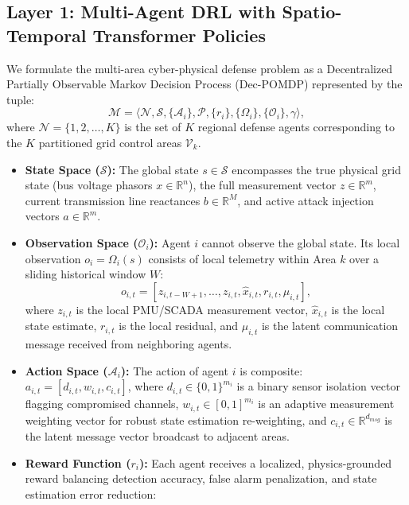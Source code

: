 \documentclass[journal,compsoc]{IEEEtran}
\begin{document}
\subsection{Layer 1: Multi-Agent DRL with Spatio-Temporal Transformer Policies}
We formulate the multi-area cyber-physical defense problem as a Decentralized Partially Observable Markov Decision Process (Dec-POMDP) represented by the tuple:
\begin{equation}
    \mathcal{M} = \langle \mathcal{N}, \mathcal{S}, \{\mathcal{A}_i\}, \mathcal{P}, \{r_i\}, \{\Omega_i\}, \{\mathcal{O}_i\}, \gamma \rangle,
\end{equation}
where $\mathcal{N} = \{1, 2, \dots, K\}$ is the set of $K$ regional defense agents corresponding to the $K$ partitioned grid control areas $\mathcal{V}_k$.
\begin{itemize}
    \item \textbf{State Space ($\mathcal{S}$):} The global state $s \in \mathcal{S}$ encompasses the true physical grid state (bus voltage phasors $x \in \mathbb{R}^n$), the full measurement vector $z \in \mathbb{R}^m$, current transmission line reactances $b \in \mathbb{R}^M$, and active attack injection vectors $a \in \mathbb{R}^m$.
    \item \textbf{Observation Space ($\mathcal{O}_i$):} Agent $i$ cannot observe the global state. Its local observation $o_i = \Omega_i(s)$ consists of local telemetry within Area $k$ over a sliding historical window $W$:
    \begin{equation}
        o_{i,t} = [z_{i, t-W+1}, \dots, z_{i, t}, \hat{x}_{i, t}, r_{i, t}, \mu_{i, t}],
    \end{equation}
    where $z_{i, t}$ is the local PMU/SCADA measurement vector, $\hat{x}_{i, t}$ is the local state estimate, $r_{i, t}$ is the local residual, and $\mu_{i, t}$ is the latent communication message received from neighboring agents.
    \item \textbf{Action Space ($\mathcal{A}_i$):} The action of agent $i$ is composite: $a_{i,t} = [d_{i,t}, w_{i,t}, c_{i,t}]$, where $d_{i,t} \in \{0, 1\}^{m_i}$ is a binary sensor isolation vector flagging compromised channels, $w_{i,t} \in [0, 1]^{m_i}$ is an adaptive measurement weighting vector for robust state estimation re-weighting, and $c_{i,t} \in \mathbb{R}^{d_{msg}}$ is the latent message vector broadcast to adjacent areas.
    \item \textbf{Reward Function ($r_i$):} Each agent receives a localized, physics-grounded reward balancing detection accuracy, false alarm penalization, and state estimation error reduction:

\end{itemize}
\end{document}
